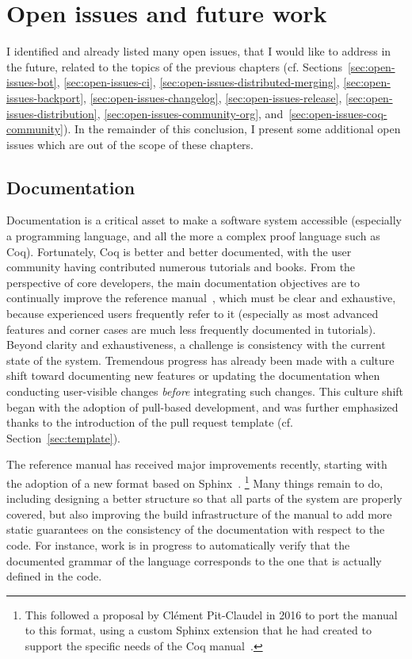 \section{Open issues and future work}

I identified and already listed many open issues, that I would like to address in the future, related to the topics of the previous chapters (cf. Sections~\ref{sec:open-issues-bot}, \ref{sec:open-issues-ci}, \ref{sec:open-issues-distributed-merging}, \ref{sec:open-issues-backport}, \ref{sec:open-issues-changelog}, \ref{sec:open-issues-release}, \ref{sec:open-issues-distribution}, \ref{sec:open-issues-community-org}, and~\ref{sec:open-issues-coq-community}).
In the remainder of this conclusion, I present some additional open issues which are out of the scope of these chapters.

\subsection{Documentation}

Documentation is a critical asset to make a software system accessible (especially a programming language, and all the more a complex proof language such as Coq).
Fortunately, Coq is better and better documented, with the user community having contributed numerous tutorials and books.
From the perspective of core developers, the main documentation objectives are to continually improve the reference manual~\cite{coq_refman}, which must be clear and exhaustive, because experienced users frequently refer to it (especially as most advanced features and corner cases are much less frequently documented in tutorials).
Beyond clarity and exhaustiveness, a challenge is consistency with the current state of the system.
Tremendous progress has already been made with a culture shift toward documenting new features or updating the documentation when conducting user-visible changes \emph{before} integrating such changes.
This culture shift began with the adoption of pull-based development, and was further emphasized thanks to the introduction of the pull request template (cf. Section~\ref{sec:template}).

The reference manual has received major improvements recently, starting with the adoption of a new format based on Sphinx~\cite{sphinx}.%
\footnote{
	This followed a proposal by Cl\'ement Pit-Claudel in 2016 to port the manual to this format, using a custom Sphinx extension that he had created to support the specific needs of the Coq manual~\cite{pitclaudel2016}.
}
Many things remain to do, including designing a better structure so that all parts of the system are properly covered, but also improving the build infrastructure of the manual to add more static guarantees on the consistency of the documentation with respect to the code.
For instance, work is in progress to automatically verify that the documented grammar of the language corresponds to the one that is actually defined in the code.

